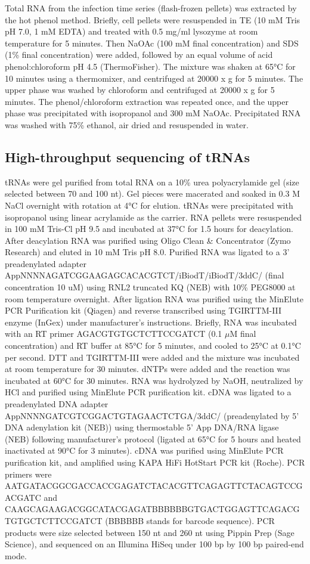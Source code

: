\documentclass[12pt,twoside]{mitthesis-manusdown}
\begin{document}
Total RNA from the infection time series (flash-frozen pellets) was
extracted by the hot phenol method. Briefly, cell pellets were
resuspended in TE (10 mM Tris pH 7.0, 1 mM EDTA) and treated with 0.5
mg/ml lysozyme at room temperature for 5 minutes. Then NaOAc (100 mM
final concentration) and SDS (1\% final concentration) were added,
followed by an equal volume of acid phenol:chloroform pH 4.5
(ThermoFisher). The mixture was shaken at 65°C for 10 minutes using a
thermomixer, and centrifuged at 20000 x g for 5 minutes. The upper phase
was washed by chloroform and centrifuged at 20000 x g for 5 minutes. The
phenol/chloroform extraction was repeated once, and the upper phase was
precipitated with isopropanol and 300 mM NaOAc. Precipitated RNA was
washed with 75\% ethanol, air dried and resuspended in water.

\subsection{High-throughput sequencing of
tRNAs}\label{high-throughput-sequencing-of-trnas}

tRNAs were gel purified from total RNA on a 10\% urea polyacrylamide gel
(size selected between 70 and 100 nt). Gel pieces were macerated and
soaked in 0.3 M NaCl overnight with rotation at 4°C for elution. tRNAs
were precipitated with isopropanol using linear acrylamide as the
carrier. RNA pellets were resuspended in 100 mM Tris-Cl pH 9.5 and
incubated at 37°C for 1.5 hours for deacylation. After deacylation RNA
was purified using Oligo Clean \& Concentrator (Zymo Research) and
eluted in 10 mM Tris pH 8.0. Purified RNA was ligated to a 3'
preadenylated adapter AppNNNNAGATCGGAAGAGCACACGTCT/iBiodT/iBiodT/3ddC/
(final concentration 10 uM) using RNL2 truncated KQ (NEB) with 10\%
PEG8000 at room temperature overnight. After ligation RNA was purified
using the MinElute PCR Purification kit (Qiagen) and reverse transcribed
using TGIRTTM-III enzyme (InGex) under manufacturer's instructions.
Briefly, RNA was incubated with an RT primer AGACGTGTGCTCTTCCGATCT (0.1
\(\mu\)M final concentration) and RT buffer at 85°C for 5 minutes, and
cooled to 25°C at 0.1°C per second. DTT and TGIRTTM-III were added and
the mixture was incubated at room temperature for 30 minutes. dNTPs were
added and the reaction was incubated at 60°C for 30 minutes. RNA was
hydrolyzed by NaOH, neutralized by HCl and purified using MinElute PCR
purification kit. cDNA was ligated to a preadenylated DNA adapter
AppNNNNGATCGTCGGACTGTAGAACTCTGA/3ddC/ (preadenylated by 5' DNA
adenylation kit (NEB)) using thermostable 5' App DNA/RNA ligase (NEB)
following manufacturer's protocol (ligated at 65°C for 5 hours and
heated inactivated at 90°C for 3 minutes). cDNA was purified using
MinElute PCR purification kit, and amplified using KAPA HiFi HotStart
PCR kit (Roche). PCR primers were
AATGATACGGCGACCACCGAGATCTACACGTTCAGAGTTCTACAGTCCGACGATC and
CAAGCAGAAGACGGCATACGAGATBBBBBBGTGACTGGAGTTCAGACGTGTGCTCTTCCGATCT (BBBBBB
stands for barcode sequence). PCR products were size selected between
150 nt and 260 nt using Pippin Prep (Sage Science), and sequenced on an
Illumina HiSeq under 100 bp by 100 bp paired-end mode.
\end{document}
